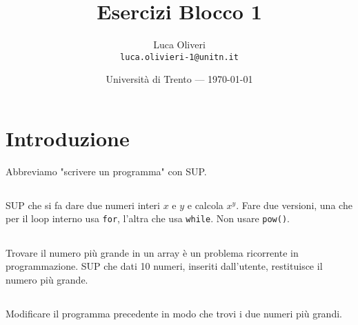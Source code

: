 \documentclass{article}
\title{Esercizi Blocco 1} %
\author{Luca Oliveri\\ \texttt{luca.olivieri-1@unitn.it}} %
\date{Università di Trento --- \today} %
\begin{document}
\maketitle %


\section*{Introduzione} %
Abbreviamo "scrivere un programma" con SUP.




\setcounter{section}{1}


\subsection{} 
SUP che si fa dare due numeri interi $x$ e $y$ e calcola $x^y$. Fare due versioni, una che per il loop interno usa \texttt{for}, l'altra che usa \texttt{while}. Non usare \texttt{pow()}.

\subsection{}
Trovare il numero più grande in un array è un problema ricorrente in programmazione. SUP che dati 10 numeri, inseriti dall'utente, restituisce il numero più grande.

\subsection{}
Modificare il programma precedente in modo che trovi i due numeri più grandi.
\end{document}
